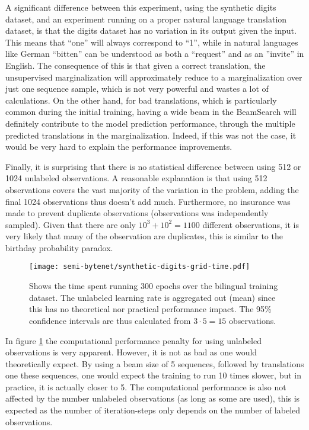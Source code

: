 A significant difference between this experiment, using the synthetic digits dataset, and an experiment running on a proper natural language translation dataset, is that the digits dataset has no variation in its output given the input. This means that ``one'' will always correspond to ``1'', while in natural languages like German ``bitten'' can be understood as both a ``request'' and as an ''invite'' in English. The consequence of this is that given a correct translation, the unsupervised marginalization will approximately reduce to a marginalization over just one sequence sample, which is not very powerful and wastes a lot of calculations. On the other hand, for bad translations, which is particularly common during the initial training, having a wide beam in the BeamSearch will definitely contribute to the model prediction performance, through the multiple predicted translations in the marginalization. Indeed, if this was not the case, it would be very hard to explain the performance improvements.

Finally, it is surprising that there is no statistical difference between using 512 or 1024 unlabeled observations. A reasonable explanation is that using 512 observations covers the vast majority of the variation in the problem, adding the final 1024 observations thus doesn't add much. Furthermore, no insurance was made to prevent duplicate observations (observations was independently sampled). Given that there are only $10^3 + 10^2 = 1100$ different observations, it is very likely that many of the observation are duplicates, this is similar to the birthday probability paradox.

\begin{figure}[h]
    \centering
    \texttt{[image: semi-bytenet/synthetic-digits-grid-time.pdf]}
    \caption{Shows the time spent running 300 epochs over the bilingual training dataset. The unlabeled learning rate is aggregated out (mean) since this has no theoretical nor practical performance impact. The 95\% confidence intervals are thus calculated from $3 \cdot 5 = 15$ observations.}
    \label{fig:result:semi-bytenet:time}
\end{figure}

In figure \ref{fig:result:semi-bytenet:time} the computational performance penalty for using unlabeled observations is very apparent. However, it is not as bad as one would theoretically expect. By using a beam size of 5 sequences, followed by translations one these sequences, one would expect the training to run 10 times slower, but in practice, it is actually closer to 5. The computational performance is also not affected by the number unlabeled observations (as long as some are used), this is expected as the number of iteration-steps only depends on the number of labeled observations.

